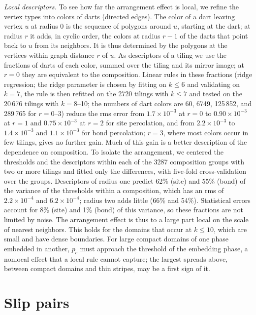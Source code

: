 \documentclass[pre,twocolumn,superscriptaddress,longbibliography,floatfix]{revtex4-2}
\newcommand{\pc}{p_c}
\begin{document}
\textit{Local descriptors.} To see how far the arrangement effect is local, we refine the vertex types into colors of darts (directed edges). The color of a dart leaving vertex $u$ at radius 0 is the sequence of polygons around $u$, starting at the dart; at radius $r$ it adds, in cyclic order, the colors at radius $r-1$ of the darts that point back to $u$ from its neighbors. It is thus determined by the polygons at the vertices within graph distance $r$ of $u$. As descriptors of a tiling we use the fractions of darts of each color, summed over the tiling and its mirror image; at $r=0$ they are equivalent to the composition. Linear rules in these fractions (ridge regression; the ridge parameter is chosen by fitting on $k\le6$ and validating on $k=7$, the rule is then refitted on the 2720 tilings with $k\le7$ and tested on the 20\,676 tilings with $k=8$--10; the numbers of dart colors are 60, 6749, 125\,852, and 289\,765 for $r=0$--3) reduce the rms error from $1.7\times10^{-3}$ at $r=0$ to $0.90\times10^{-3}$ at $r=1$ and $0.75\times10^{-3}$ at $r=2$ for site percolation, and from $2.2\times10^{-3}$ to $1.4\times10^{-3}$ and $1.1\times10^{-3}$ for bond percolation; $r=3$, where most colors occur in few tilings, gives no further gain. Much of this gain is a better description of the dependence on composition. To isolate the arrangement, we centered the thresholds and the descriptors within each of the 3287 composition groups with two or more tilings and fitted only the differences, with five-fold cross-validation over the groups. Descriptors of radius one predict 62\% (site) and 55\% (bond) of the variance of the thresholds within a composition, which has an rms of $2.2\times10^{-4}$ and $6.2\times10^{-4}$; radius two adds little (66\% and 54\%). Statistical errors account for 8\% (site) and 1\% (bond) of this variance, so these fractions are not limited by noise. The arrangement effect is thus to a large part local on the scale of nearest neighbors. This holds for the domains that occur at $k\le10$, which are small and have dense boundaries. For large compact domains of one phase embedded in another, $\pc$ must approach the threshold of the embedding phase, a nonlocal effect that a local rule cannot capture; the largest spreads above, between compact domains and thin stripes, may be a first sign of it.

\section{Slip pairs}\label{sec:slip}
\end{document}

